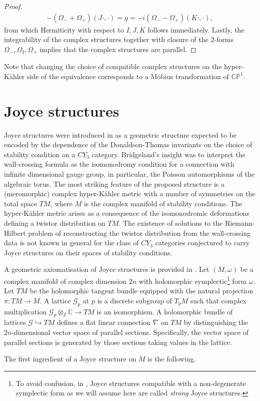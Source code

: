 \documentclass[a4paper,12pt,reqno]{amsart}
\numberwithin{equation}{section}
\numberwithin{counter2}{section}
\begin{document}
\begin{proof}
  \begin{align}
  -(\Omega_- +\Omega_+)(J\cdot,\cdot) = g = -i(\Omega_- -\Omega_+)(K\cdot,\cdot), 
  \end{align}
  from which Hermiticity with respect to $I,J,K$ follows immediately.  Lastly,  the integrability of the complex structures together with closure of the $2$-forms  $\Omega_{-},\Omega_{I},\Omega_{+}$ implies that the complex structures are parallel.  
  \end{proof}
Note that changing the choice of compatible complex structures on the hyper-K\"ahler side of the equivalence corresponds to a M\"obius transformation of $\mathbb{CP}^1$.  \par
\section{Joyce structures}\label{Joyceintro}
Joyce structures were introduced in \cite{B3} as a geometric structure expected to be encoded by the dependence of the Donaldson-Thomas invariants on the choice of stability condition on a $CY_3$ category.  Bridgeland's insight was to interpret the wall-crossing formula as the isomonodromy condition for a connection with infinite dimensional gauge group,  in particular,   the Poisson automorphisms of the algebraic torus.  The most striking feature of the proposed structure is a (meromorphic) complex hyper-K\"ahler metric with a number of symmetries on the total space $TM$,  where $M$ is the complex manifold of stability conditions.  The hyper-K\"ahler metric arises as a consequence of the isomonodromic deformations defining a twistor distribution on $TM$.  The existence of solutions to the Riemann-Hilbert problem of reconstructing the twistor distribution from the wall-crossing data is not known in general for the class of $CY_3$ categories conjectured to carry Joyce structures on their spaces of stability conditions.  \par 
A geometric axiomatisation of Joyce structures is provided in \cite{BS}.  Let $(M,\omega)$ be a complex manifold of complex dimension $2n$ with holomorphic symplectic\footnote{To avoid confusion,  in \cite{BS},  Joyce structures compatible with a non-degenerate symplectic form as we will assume here are called \textit{strong} Joyce structures. } form $\omega$.  Let $TM$ be the holomorphic tangent bundle equipped with the natural projection $\pi: TM \to M$.  A lattice $\mathcal{G}_p$ at $p$ is a discrete subgroup of $T_pM$ such that complex multiplication $\mathcal{G}_p \otimes_{\mathbb{Z}} \mathbb{C} \to TM$ is an isomorphism.  A holomorphic bundle of lattices $\mathcal{G} \hookrightarrow TM$ defines a flat linear connection $\nabla$ on $TM$ by distinguishing the $2n$-dimensional vector space of parallel sections.  Specifically,  the vector space of parallel sections is generated by those sections taking values in the lattice.  \par The first ingredient of a Joyce structure on $M$ is the following.  
\end{document}

